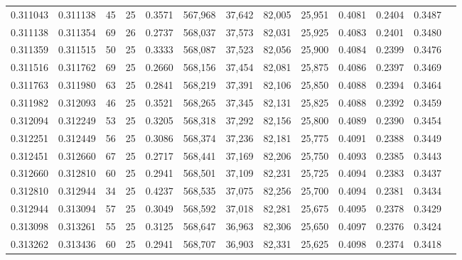 \begin{tabular}{rrrrrrrrrrrrr}
0.311043 & 0.311138 &    45 &  25 &                                     0.3571 & 567,968 &  37,642 &  82,005 &  25,951 & 0.4081 & 0.2404 & 0.3487 \\
0.311138 & 0.311354 &    69 &  26 &                                     0.2737 & 568,037 &  37,573 &  82,031 &  25,925 & 0.4083 & 0.2401 & 0.3480 \\
0.311359 & 0.311515 &    50 &  25 &                                     0.3333 & 568,087 &  37,523 &  82,056 &  25,900 & 0.4084 & 0.2399 & 0.3476 \\
0.311516 & 0.311762 &    69 &  25 &                                     0.2660 & 568,156 &  37,454 &  82,081 &  25,875 & 0.4086 & 0.2397 & 0.3469 \\
0.311763 & 0.311980 &    63 &  25 &                                     0.2841 & 568,219 &  37,391 &  82,106 &  25,850 & 0.4088 & 0.2394 & 0.3464 \\
0.311982 & 0.312093 &    46 &  25 &                                     0.3521 & 568,265 &  37,345 &  82,131 &  25,825 & 0.4088 & 0.2392 & 0.3459 \\
0.312094 & 0.312249 &    53 &  25 &                                     0.3205 & 568,318 &  37,292 &  82,156 &  25,800 & 0.4089 & 0.2390 & 0.3454 \\
0.312251 & 0.312449 &    56 &  25 &                                     0.3086 & 568,374 &  37,236 &  82,181 &  25,775 & 0.4091 & 0.2388 & 0.3449 \\
0.312451 & 0.312660 &    67 &  25 &                                     0.2717 & 568,441 &  37,169 &  82,206 &  25,750 & 0.4093 & 0.2385 & 0.3443 \\
0.312660 & 0.312810 &    60 &  25 &                                     0.2941 & 568,501 &  37,109 &  82,231 &  25,725 & 0.4094 & 0.2383 & 0.3437 \\
0.312810 & 0.312944 &    34 &  25 &                                     0.4237 & 568,535 &  37,075 &  82,256 &  25,700 & 0.4094 & 0.2381 & 0.3434 \\
0.312944 & 0.313094 &    57 &  25 &                                     0.3049 & 568,592 &  37,018 &  82,281 &  25,675 & 0.4095 & 0.2378 & 0.3429 \\
0.313098 & 0.313261 &    55 &  25 &                                     0.3125 & 568,647 &  36,963 &  82,306 &  25,650 & 0.4097 & 0.2376 & 0.3424 \\
0.313262 & 0.313436 &    60 &  25 &                                     0.2941 & 568,707 &  36,903 &  82,331 &  25,625 & 0.4098 & 0.2374 & 0.3418 \\

\end{tabular}
